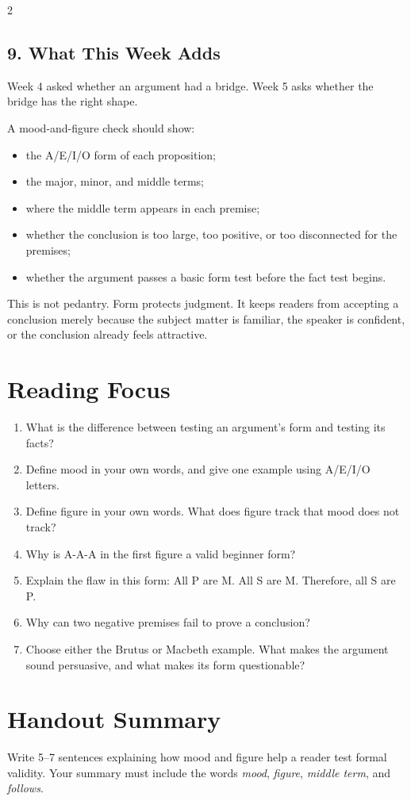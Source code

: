\documentclass[12pt]{article}
\begin{document}
\begin{multicols}{2}
\subsection*{9. What This Week Adds}
Week 4 asked whether an argument had a bridge. Week 5 asks whether the bridge has the right shape.

A mood-and-figure check should show:
\begin{itemize}[leftmargin=*]
\item the A/E/I/O form of each proposition;
\item the major, minor, and middle terms;
\item where the middle term appears in each premise;
\item whether the conclusion is too large, too positive, or too disconnected for the premises;
\item whether the argument passes a basic form test before the fact test begins.
\end{itemize}

This is not pedantry. Form protects judgment. It keeps readers from accepting a conclusion merely because the subject matter is familiar, the speaker is confident, or the conclusion already feels attractive.

\section*{Reading Focus}
\begin{enumerate}[leftmargin=*]
\item What is the difference between testing an argument's form and testing its facts?
\item Define mood in your own words, and give one example using A/E/I/O letters.
\item Define figure in your own words. What does figure track that mood does not track?
\item Why is A-A-A in the first figure a valid beginner form?
\item Explain the flaw in this form: All P are M. All S are M. Therefore, all S are P.
\item Why can two negative premises fail to prove a conclusion?
\item Choose either the Brutus or Macbeth example. What makes the argument sound persuasive, and what makes its form questionable?
\end{enumerate}

\section*{Handout Summary}
Write 5--7 sentences explaining how mood and figure help a reader test formal validity. Your summary must include the words \textit{mood}, \textit{figure}, \textit{middle term}, and \textit{follows}.
\end{multicols}
\end{document}
